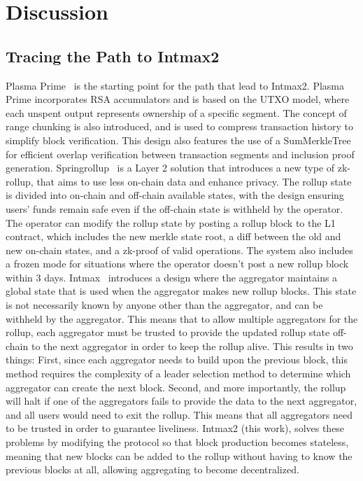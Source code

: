 \section{Discussion}

\subsection{Tracing the Path to Intmax2}

Plasma Prime~\cite{plasma_prime} is the starting point for the path
that lead to Intmax2. Plasma Prime incorporates RSA accumulators and
is based on the UTXO model, where each unspent output represents
ownership of a specific segment. The concept of range chunking is
also introduced, and is used to compress transaction history to
simplify block verification. This design also features the use of a
SumMerkleTree for efficient overlap verification between transaction
segments and inclusion proof generation.
\smallbreak
Springrollup~\cite{springrollup} is a Layer 2 solution that
introduces a new type of zk-rollup, that aims to use less on-chain
data and enhance privacy. The rollup state is divided into on-chain
and off-chain available states, with the design ensuring users' funds
remain safe even if the off-chain state is withheld by the operator.
The operator can modify the rollup state by posting a rollup block to
the L1 contract, which includes the new merkle state root, a diff
between the old and new on-chain states, and a zk-proof of valid
operations. The system also includes a frozen mode for situations
where the operator doesn't post a new rollup block within 3 days.
\smallbreak
Intmax~\cite{intmax} introduces a design where the aggregator
maintains a global state that is used when the aggregator makes new
rollup blocks. This state is not necessarily known by anyone other
than the aggregator, and can be withheld by the aggregator. This
means that to allow multiple aggregators for the rollup, each
aggregator must be trusted to provide the updated rollup state
off-chain to the next aggregator in order to keep the rollup alive.
This results in two things: First, since each aggregator needs to
build upon the previous block, this method requires the complexity of
a leader selection method to determine which aggregator can create
the next block. Second, and more importantly, the rollup will halt if
one of the aggregators fails to provide the data to the next
aggregator, and all users would need to exit the rollup. This means
that all aggregators need to be trusted in order to guarantee liveliness.
\smallbreak
Intmax2 (this work), solves these problems by modifying the protocol
so that block production becomes stateless,
meaning that new blocks can be added to the rollup without having to
know the previous blocks at all, allowing aggregating to become decentralized.

